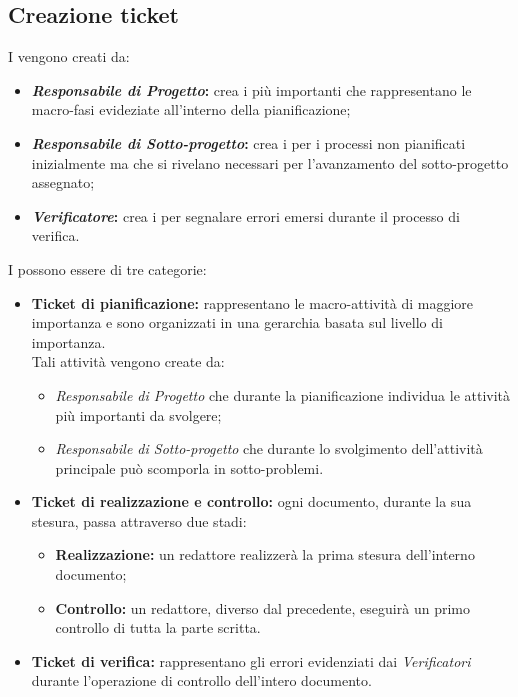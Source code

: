   \subsection{Creazione ticket}
    I  vengono creati da:
    \begin{itemize}
      \item \textbf{\emph{Responsabile di Progetto}: }crea i  più importanti che rappresentano le macro-fasi evideziate
      all'interno della pianificazione;
      \item \textbf{\emph{Responsabile di Sotto-progetto}: }crea i  per i processi non pianificati inizialmente ma che si rivelano necessari
      per l'avanzamento del sotto-progetto assegnato;
      \item \textbf{\emph{Verificatore}: }crea i  per segnalare errori emersi durante il processo di verifica.
    \end{itemize}
    I  possono essere di tre categorie:
    \begin{itemize}
      \item \textbf{Ticket di pianificazione: }rappresentano le macro-attività di maggiore importanza e sono organizzati in una gerarchia
      basata sul livello di importanza.\\
      Tali attività vengono create da:
      \bgroup
        \begin{itemize}
          \item \emph{Responsabile di Progetto} che durante la pianificazione individua le attività più importanti da svolgere;
          \item \emph{Responsabile di Sotto-progetto} che durante lo svolgimento dell'attività principale può scomporla in sotto-problemi.
        \end{itemize}
      \egroup
      \item \textbf{Ticket di realizzazione e controllo: }ogni documento, durante la sua stesura, passa attraverso due stadi:
      \bgroup
        \begin{itemize}
          \item \textbf{Realizzazione: }un redattore realizzerà la prima stesura dell'interno documento;
          \item \textbf{Controllo: }un redattore, diverso dal precedente, eseguirà un primo controllo di tutta la parte scritta.
        \end{itemize}
      \egroup
      \item \textbf{Ticket di verifica: }rappresentano gli errori evidenziati dai \emph{Verificatori} durante l'operazione di controllo dell'intero documento.
    \end{itemize}
